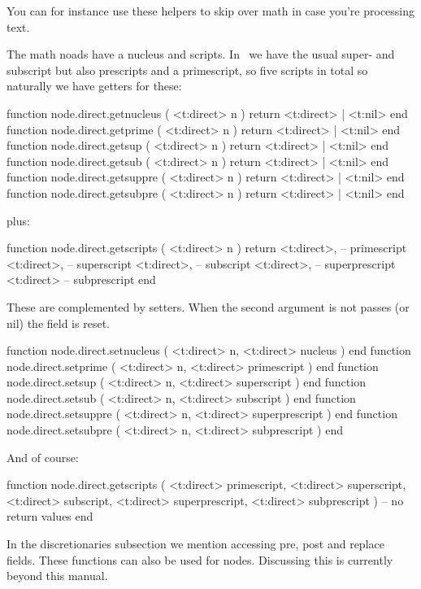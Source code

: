 You can for instance use these helpers to skip over math in case you're
processing text.

The math noads have a nucleus and scripts. In \LUAMETATEX\ we have the usual
super- and subscript but also prescripts and a primescript, so five scripts in
total so naturally we have getters for these:

\starttyping[option=LUA]
function node.direct.getnucleus ( <t:direct> n ) return <t:direct> | <t:nil> end
function node.direct.getprime   ( <t:direct> n ) return <t:direct> | <t:nil> end
function node.direct.getsup     ( <t:direct> n ) return <t:direct> | <t:nil> end
function node.direct.getsub     ( <t:direct> n ) return <t:direct> | <t:nil> end
function node.direct.getsuppre  ( <t:direct> n ) return <t:direct> | <t:nil> end
function node.direct.getsubpre  ( <t:direct> n ) return <t:direct> | <t:nil> end
\stoptyping

plus:

\starttyping[option=LUA]
function node.direct.getscripts ( <t:direct> n )
    return
        <t:direct>, -- primescript
        <t:direct>, -- superscript
        <t:direct>, -- subscript
        <t:direct>, -- superprescript
        <t:direct>  -- subprescript
end
\stoptyping

These are complemented by setters. When the second argument is not passes (or nil)
the field is reset.

\starttyping[option=LUA]
function node.direct.setnucleus ( <t:direct> n, <t:direct> nucleus        ) end
function node.direct.setprime   ( <t:direct> n, <t:direct> primescript    ) end
function node.direct.setsup     ( <t:direct> n, <t:direct> superscript    ) end
function node.direct.setsub     ( <t:direct> n, <t:direct> subscript      ) end
function node.direct.setsuppre  ( <t:direct> n, <t:direct> superprescript ) end
function node.direct.setsubpre  ( <t:direct> n, <t:direct> subprescript   ) end
\stoptyping

And of course:

\starttyping[option=LUA]
function node.direct.getscripts (
    <t:direct> primescript,
    <t:direct> superscript,
    <t:direct> subscript,
    <t:direct> superprescript,
    <t:direct> subprescript
)
    -- no return values
end
\stoptyping

In the discretionaries subsection we mention accessing pre, post and replace
fields. These functions can also be used for  nodes. Discussing
this is currently beyond this manual.

\stopsubsection


